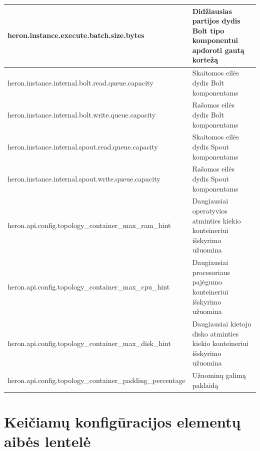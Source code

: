 \documentclass{VUMIFPSbakalaurinis}
\begin{document}
\begin{longtable}{|p{0.59\linewidth}|p{0.41\linewidth}|}
    heron.instance.execute.batch.size.bytes                               & Didžiausias partijos dydis Bolt tipo komponentui apdoroti gautą kortežą        \\ \hline
    heron.instance.internal.bolt.read.queue.capacity                      & Skaitomos eilės dydis Bolt komponentams                                        \\ \hline
    heron.instance.internal.bolt.write.queue.capacity                     & Rašomos eilės dydis Bolt komponentams                                          \\ \hline
    heron.instance.internal.spout.read.queue.capacity                     & Skaitomos eilės dydis Spout komponentams                                       \\ \hline
    heron.instance.internal.spout.write.queue.capacity                    & Rašomos eilės dydis Spout komponentams                                         \\ \hline
    heron.api.config.topology\_container\_max\_ram\_hint                  & Daugiausiai operatyvios atminties kiekio konteineriui išskyrimo užuomina       \\ \hline
    heron.api.config.topology\_container\_max\_cpu\_hint                  & Daugiausiai procesoriaus pajėgumo konteineriui išskyrimo užuomina              \\ \hline
    heron.api.config.topology\_container\_max\_disk\_hint                 & Daugiausiai kietojo disko atminties kiekio konteineriui išskyrimo užuomina    \\ \hline
    heron.api.config.topology\_container\_padding\_percentage             & Užuominų galimą paklaidą                                                       \\ \hline
\end{longtable}

\section{Keičiamų konfigūracijos elementų aibės lentelė}
\end{document}

